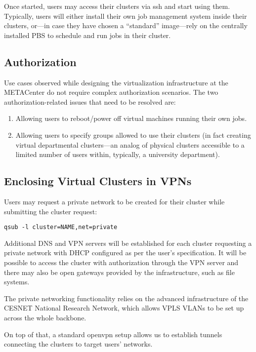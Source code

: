 \documentclass{article}
\begin{document}
Once started, users may access their clusters via ssh and start using them. Typically, users will either install their own job management system inside their clusters, or---in case they have chosen a ``standard'' image---rely on the centrally installed PBS to schedule and run jobs in their cluster.

\subsection{Authorization}

Use cases observed while designing the virtualization infrastructure at the METACenter do not require complex authorization scenarios. The two authorization-related issues that need to be resolved are:

\begin{enumerate}
\item Allowing users to reboot/power off virtual machines running their own jobs.
\item Allowing users to specify groups allowed to use their clusters (in fact creating virtual departmental clusters---an analog of physical clusters accessible to a limited number of users within, typically, a university department).
\end{enumerate}

\subsection{Enclosing Virtual Clusters in VPNs}

Users may request a private network to be created for their cluster while submitting the cluster request:

\medskip

\texttt{qsub -l cluster=NAME,net=private}

\medskip

Additional DNS and VPN servers will be established for each cluster requesting a private network with DHCP configured as per the user's specification. It will be possible to access the cluster with authorization through the VPN server and there may also be open gateways provided by the infrastructure, such as file systems.

The private networking functionality relies on the advanced infrastructure of the CESNET National Research Network, which allows VPLS VLANs to be set up across the whole backbone.

On top of that, a standard openvpn setup allows us to establish tunnels connecting the clusters to target users' networks.
\end{document}
